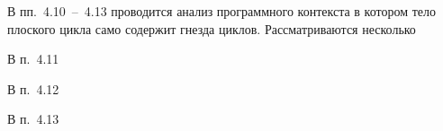 \documentclass[a4paper,14pt]{extarticle}                     %
\theoremstyle{plain}                                         %
\begin{document}

В пп.~4.10~--~4.13 проводится анализ программного контекста в котором тело плоского цикла само содержит гнезда циклов.
Рассматриваются несколько  


В п.~4.11


В п.~4.12


В п.~4.13

\end{document}
